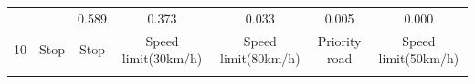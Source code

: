 \documentclass[11pt]{article}
\begin{document}
\begin{longtable}[]{@{}ccccccc@{}}
\begin{minipage}[t]{0.04\columnwidth}\centering\strut
\strut
\end{minipage} & \begin{minipage}[t]{0.04\columnwidth}\centering\strut
\strut
\end{minipage} & \begin{minipage}[t]{0.04\columnwidth}\centering\strut
0.589\strut
\end{minipage} & \begin{minipage}[t]{0.04\columnwidth}\centering\strut
0.373\strut
\end{minipage} & \begin{minipage}[t]{0.04\columnwidth}\centering\strut
0.033\strut
\end{minipage} & \begin{minipage}[t]{0.04\columnwidth}\centering\strut
0.005\strut
\end{minipage} & \begin{minipage}[t]{0.04\columnwidth}\centering\strut
0.000\strut
\end{minipage}\tabularnewline
\begin{minipage}[t]{0.04\columnwidth}\centering\strut
10\strut
\end{minipage} & \begin{minipage}[t]{0.04\columnwidth}\centering\strut
Stop\strut
\end{minipage} & \begin{minipage}[t]{0.04\columnwidth}\centering\strut
Stop\strut
\end{minipage} & \begin{minipage}[t]{0.04\columnwidth}\centering\strut
Speed limit(30km/h)\strut
\end{minipage} & \begin{minipage}[t]{0.04\columnwidth}\centering\strut
Speed limit(80km/h)\strut
\end{minipage} & \begin{minipage}[t]{0.04\columnwidth}\centering\strut
Priority road\strut
\end{minipage} & \begin{minipage}[t]{0.04\columnwidth}\centering\strut
Speed limit(50km/h)\strut
\end{minipage}\tabularnewline
\begin{minipage}[t]{0.04\columnwidth}\centering\strut
\strut
\end{minipage} & \begin{minipage}[t]{0.04\columnwidth}\centering\strut
\strut

\end{minipage}
\end{longtable}
\end{document}
